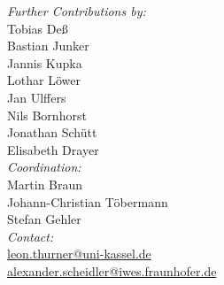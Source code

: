 \begin{titlepage}
\textit{Further Contributions by:} \\
Tobias Deß \\
Bastian Junker\\
Jannis Kupka\\
Lothar Löwer\\
Jan Ulffers\\
Nils Bornhorst\\
Jonathan Schütt\\
Elisabeth Drayer\\[1em]

\textit{Coordination:}\\
Martin Braun \\
Johann-Christian Töbermann \\
Stefan Gehler \\[1em]


\flushright
\textit{Contact:} \\
\href{mailto:leon.thurner@uni-kassel.de}{leon.thurner@uni-kassel.de} \\
\hspace{1cm} \href{mailto:alexander.scheidler@iwes.fraunhofer.de}{alexander.scheidler@iwes.fraunhofer.de}
\end{titlepage}